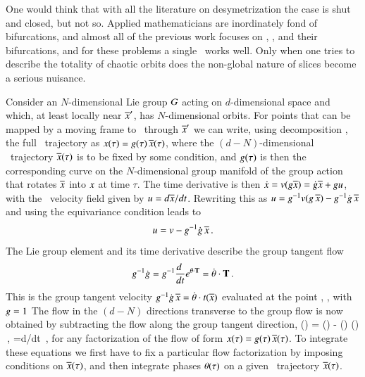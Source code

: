 \documentclass[preprint,number,sort&compress]{elsarticle}
\begin{document}
One would think that with all the literature on
desymetrization the case is shut and closed, but not so.
Applied mathematicians are inordinately fond of bifurcations,
and almost all of the previous work focuses on \eqva, \reqva,
and their bifurcations, and for these problems a single
\slice\ works well. Only when one tries to describe the
totality of chaotic orbits does the non-global nature of
slices become a serious nuisance.

Consider an $N$-dimensional Lie group $G$ acting on
$d$-dimensional space and which, at least locally near
${\overline{x}'}$, has $N$-dimensional orbits. For points that can be
mapped by a moving frame to \slice\ through ${\overline{x}'}$ we can
write, using decomposition , the full
\statesp\ trajectory as $x(\tau)=
g(\tau)\,\overline{x}(\tau)$, where the
$(d\!-\!N)$-dim\-ens\-ion\-al \reducedsp\ trajectory
$\overline{x}(\tau)$ is to be fixed by some condition, and
$g(\tau)$ is then the corresponding curve on the
$N$-dim\-ens\-ion\-al group manifold of the group action that
rotates $\overline{x}$ into $x$ at time $\tau$. The time
derivative is then $\dot{x}= v(g\overline{x}) =
\dot{g}\overline{x} + gu$, with the \reducedsp\
velocity field given by $u={d\overline{x}}/{dt}$. Rewriting
this as $ u = g^{-1} v(g \, \overline{x}) -
g^{-1} \dot{g} \, \overline{x} $ and using the
equivariance condition  leads to
\[
u = v - g^{-1} \dot{g} \, \overline{x}
\,.
\]
The Lie group element  and its time
derivative describe the group tangent flow
\[
g^{-1} \dot{g} =
g^{-1}\frac{d~}{dt} e^{{\bf \theta} \cdot \mathbf{T} } =
\dot{{\bf \theta}} \cdot \mathbf{T}
\,.
\]
This is the group tangent velocity $g^{-1} \dot{g}
\, \overline{x} = \dot{{\bf \theta}} \cdot t(\overline{x})$
evaluated at the point \sspRed, \ie, with ${g} = 1$
 The flow in the $(d\!-\!N)$
directions transverse to the group flow is now obtained by
subtracting the flow along the group tangent direction,
\beq
\velRed(\sspRed) = \vel(\sspRed)
      - \dot{\gSpace}(\sspRed) \cdot \groupTan(\sspRed)
\,,\qquad
\velRed={d\sspRed}/{dt}
\,,
for any factorization of the flow of form $x(\tau)=
g(\tau)\, \overline{x}(\tau)$. To integrate these equations
we first have to fix a particular flow factorization by
imposing conditions on $\overline{x}(\tau)$, and then integrate
phases ${\bf \theta}(\tau)$ on a given \reducedsp\ trajectory
$\overline{x}(\tau)$.
\end{document}
